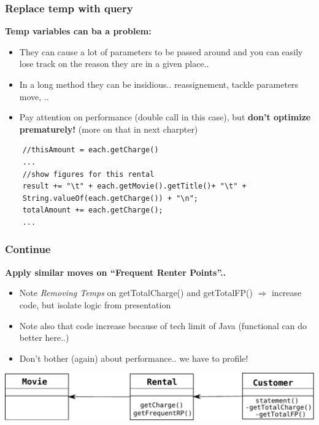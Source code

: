 \documentclass{beamer}
\begin{document}
\begin{frame}[containsverbatim]
  \frametitle{Replace temp with query}
  \textbf{Temp variables can ba a problem:}
   \begin{itemize}
  		\item They can cause a lot of parameters to be passed around and you can easily lose track on the reason they are in a given place..
		\item In a long method they can be insidious.. reassignement, tackle parameters move, ..
		\item Pay attention on performance (double call in this case), but \textbf{don't optimize prematurely!} (more on that in next charpter)
  \end{itemize}
  \begin{lstlisting}
  	//thisAmount = each.getCharge()
	...
	//show figures for this rental
	result += "\t" + each.getMovie().getTitle()+ "\t" +
	String.valueOf(each.getCharge()) + "\n";
	totalAmount += each.getCharge();
	...
	\end{lstlisting}
\end{frame}

\begin{frame}
  \frametitle{Continue}
  \textbf{Apply similar moves on ``Frequent Renter Points''.. }
     \begin{itemize}
  		\item Note \textit{Removing Temps} on getTotalCharge() and getTotalFP() $\Rightarrow$ increase code, but isolate logic from presentation
  		\item Note also that code increase because of tech limit of Java (functional can do better here..)
  		\item Don't bother (again) about performance.. we have to profile!
  	\end{itemize}
  	\begin{center}
		\includegraphics[scale=0.5]{refactorApply}
	\end{center}
\end{frame}
\end{document}
